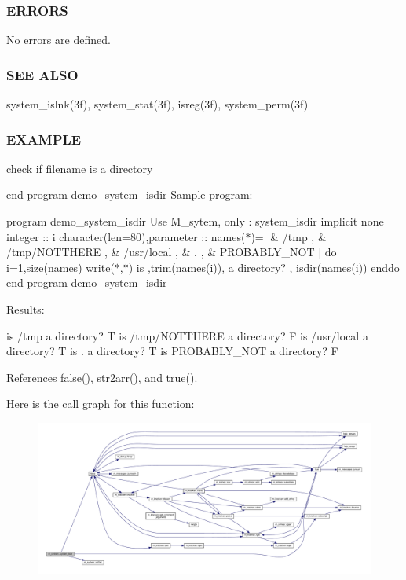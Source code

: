 \subsubsection*{E\+R\+R\+O\+RS}

No errors are defined.

\subsubsection*{S\+EE A\+L\+SO}

system\+\_\+islnk(3f), system\+\_\+stat(3f), isreg(3f), system\+\_\+perm(3f)

\subsubsection*{E\+X\+A\+M\+P\+LE}

check if filename is a directory

end program demo\+\_\+system\+\_\+isdir Sample program\+:

program demo\+\_\+system\+\_\+isdir Use M\+\_\+sytem, only \+: system\+\_\+isdir implicit none integer \+:\+: i character(len=80),parameter \+:\+: names($\ast$)=\mbox{[} \& \textquotesingle{}/tmp \textquotesingle{}, \& \textquotesingle{}/tmp/\+N\+O\+T\+T\+H\+E\+RE \textquotesingle{}, \& \textquotesingle{}/usr/local \textquotesingle{}, \& \textquotesingle{}. \textquotesingle{}, \& \textquotesingle{}P\+R\+O\+B\+A\+B\+L\+Y\+\_\+\+N\+OT \textquotesingle{}\mbox{]} do i=1,size(names) write($\ast$,$\ast$)\textquotesingle{} is \textquotesingle{},trim(names(i)),\textquotesingle{} a directory? \textquotesingle{}, isdir(names(i)) enddo end program demo\+\_\+system\+\_\+isdir

Results\+:

is /tmp a directory? T is /tmp/\+N\+O\+T\+T\+H\+E\+RE a directory? F is /usr/local a directory? T is . a directory? T is P\+R\+O\+B\+A\+B\+L\+Y\+\_\+\+N\+OT a directory? F 

References false(), str2arr(), and true().

Here is the call graph for this function\+:
\nopagebreak
\begin{figure}[H]
\begin{center}
\leavevmode
\includegraphics[width=350pt]{namespacem__system_ad097988a031e64b4f21f856cf45c9c73_cgraph}
\end{center}
\end{figure}
\mbox{\label{namespacem__system_acbcaa0c5075ca103815f441ee410e1a3}} 
